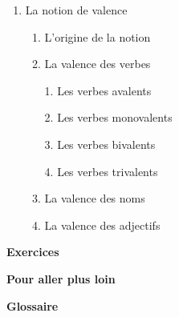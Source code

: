 \begin{keybox}
\begin{enumerate}[label=\arabic*.]
\begin{enumerate}[label=\textcircled{\scriptsize\arabic*}]
\item Les actants\par 1. Prime actant\par 2. Second actant et tiers actant
\item Les circonstants
\end{enumerate}
\item La notion de valence
\begin{enumerate}[label=\textcircled{\scriptsize\arabic*}]
\item L’origine de la notion
\item La valence des verbes\par
1. Les verbes avalents\par 2. Les verbes monovalents\par
3. Les verbes bivalents\par 4. Les verbes trivalents
\item La valence des noms
\item La valence des adjectifs
\end{enumerate}
\end{enumerate}
\textbf{Exercices}\par\textbf{Pour aller plus loin}\par\textbf{Glossaire}
\end{keybox}

